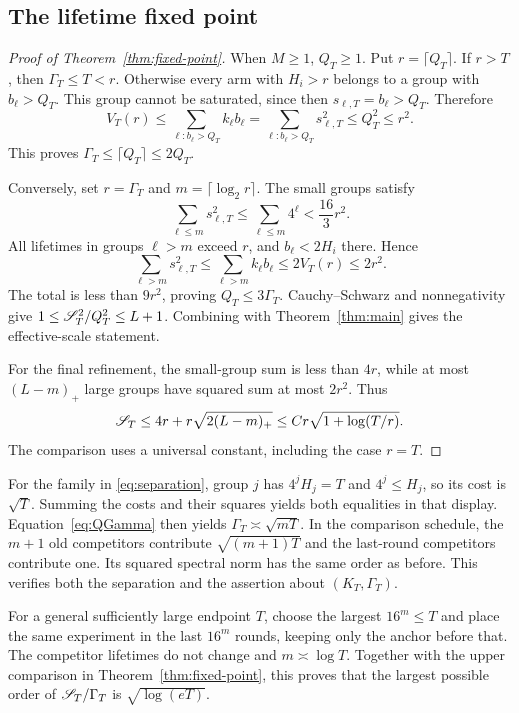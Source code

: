\subsection{The lifetime fixed point}
\begin{proof}[Proof of Theorem~\ref{thm:fixed-point}]
When $M\ge1$, $Q_T\ge1$. Put $r=\lceil Q_T\rceil$. If $r>T$, then $\Gamma_T\le T<r$. Otherwise every arm with $H_i>r$ belongs to a group with $b_\ell>Q_T$. This group cannot be saturated, since then $s_{\ell,T}=b_\ell>Q_T$. Therefore
\[
 V_T(r)\le\sum_{\ell:b_\ell>Q_T}k_\ell b_\ell
 =\sum_{\ell:b_\ell>Q_T}s_{\ell,T}^2\le Q_T^2\le r^2.
\]
This proves $\Gamma_T\le\lceil Q_T\rceil\le2Q_T$.

Conversely, set $r=\Gamma_T$ and $m=\lceil\log_2r\rceil$. The small groups satisfy
\[
 \sum_{\ell\le m}s_{\ell,T}^2\le\sum_{\ell\le m}4^\ell
 <\frac{16}3r^2.
\]
All lifetimes in groups $\ell>m$ exceed $r$, and $b_\ell<2H_i$ there. Hence
\[
 \sum_{\ell>m}s_{\ell,T}^2\le\sum_{\ell>m}k_\ell b_\ell
 \le2V_T(r)\le2r^2.
\]
The total is less than $9r^2$, proving $Q_T\le3\Gamma_T$. Cauchy--Schwarz and nonnegativity give $1\le\mathscr S_T^2/Q_T^2\le L+1$. Combining with Theorem~\ref{thm:main} gives the effective-scale statement.

For the final refinement, the small-group sum is less than $4r$, while at most $(L-m)_+$ large groups have squared sum at most $2r^2$. Thus
\[
 \mathscr S_T\le4r+r\sqrt{2(L-m)_+}
 \le C r\sqrt{1+\log(T/r)}.
\]
The comparison uses a universal constant, including the case $r=T$.
\end{proof}

For the family in \eqref{eq:separation}, group $j$ has $4^jH_j=T$ and $4^j\le H_j$, so its cost is $\sqrt T$. Summing the costs and their squares yields both equalities in that display. Equation~\eqref{eq:QGamma} then yields $\Gamma_T\asymp\sqrt{mT}$. In the comparison schedule, the $m+1$ old competitors contribute $\sqrt{(m+1)T}$ and the last-round competitors contribute one. Its squared spectral norm has the same order as before. This verifies both the separation and the assertion about $(K_T,\Gamma_T)$.

For a general sufficiently large endpoint $T$, choose the largest $16^m\le T$ and place the same experiment in the last $16^m$ rounds, keeping only the anchor before that. The competitor lifetimes do not change and $m\asymp\log T$. Together with the upper comparison in Theorem~\ref{thm:fixed-point}, this proves that the largest possible order of $\mathscr S_T/\Gamma_T$ is $\sqrt{\log(eT)}$.

